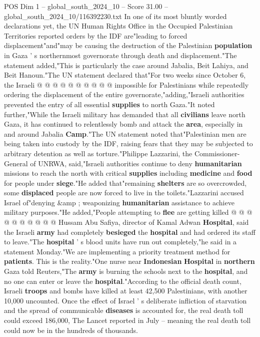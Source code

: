 \begin{textsample}{POS Dim 1 – global\_south\_2024\_10 – Score 31.00 – global\_south\_2024\_10/116392230.txt}
In one of its most bluntly worded declarations yet, the UN Human Rights Office in the Occupied Palestinian Territories reported orders by the IDF are"leading to forced displacement"and"may be causing the destruction of the Palestinian \textbf{population} in Gaza ' s northernmost governorate through death and displacement."The statement added,"This is particularly the case around Jabalia, Beit Lahiya, and Beit Hanoun."The UN statement declared that"For two weeks since October 6, the Israeli @ @ @ @ @ @ @ @ @ @ impossible for Palestinians while repeatedly ordering the displacement of the entire governorate,"adding,"Israeli authorities prevented the entry of all essential \textbf{supplies} to north Gaza."It noted further,"While the Israeli military has demanded that all \textbf{civilians} leave north Gaza, it has continued to relentlessly bomb and attack the \textbf{area}, especially in and around Jabalia \textbf{Camp}."The UN statement noted that"Palestinian men are being taken into custody by the IDF, raising fears that they may be subjected to arbitrary detention as well as torture."Philippe Lazzarini, the Commissioner-General of UNRWA, said,"Israeli authorities continue to deny \textbf{humanitarian} missions to reach the north with critical \textbf{supplies} including \textbf{medicine} and \textbf{food} for people under \textbf{siege}."He added that"remaining \textbf{shelters} are so overcrowded, some \textbf{displaced} people are now forced to live in the toilets."Lazzarini accused Israel of"denying \&amp ; weaponizing \textbf{humanitarian} assistance to achieve military purposes."He added,"People attempting to \textbf{flee} are getting killed @ @ @ @ @ @ @ @ @ @ Hussam Abu Safiya, director of Kamal Adwan \textbf{Hospital}, said the Israeli \textbf{army} had completely \textbf{besieged} the \textbf{hospital} and had ordered its staff to leave."The \textbf{hospital} ' s blood units have run out completely,"he said in a statement Monday."We are implementing a priority treatment method for \textbf{patients}.
This is the reality."One nurse near \textbf{Indonesian} \textbf{Hospital} in \textbf{northern} Gaza told Reuters,"The \textbf{army} is burning the schools next to the \textbf{hospital}, and no one can enter or leave the \textbf{hospital}."According to the official death count, Israeli \textbf{troops} and bombs have killed at least 42,500 Palestinians, with another 10,000 uncounted.
Once the effect of Israel ' s deliberate infliction of starvation and the spread of communicable \textbf{diseases} is accounted for, the real death toll could exceed 186,000, The Lancet reported in July -- meaning the real death toll could now be in the hundreds of thousands.

\end{textsample}

